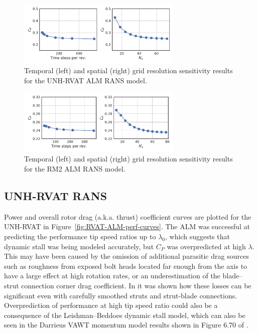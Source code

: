 \documentclass[times]{weauth}
\begin{document}
\begin{figure}
    \centering

    \includegraphics[width=0.7\textwidth]{RVAT-ALM_verification}

    \caption{Temporal (left) and spatial (right) grid resolution sensitivity
        results for the UNH-RVAT ALM RANS model.}

    \label{fig:RVAT-ALM-verification}
\end{figure}

\begin{figure}
    \centering

    \includegraphics[width=0.7\textwidth]{RM2-ALM_verification}

    \caption{Temporal (left) and spatial (right) grid resolution sensitivity
        results for the RM2 ALM RANS model.}

    \label{fig:RM2-ALM-verification}
\end{figure}


\subsection{UNH-RVAT RANS}

Power and overall rotor drag (a.k.a. thrust) coefficient curves are plotted for
the UNH-RVAT in Figure~\ref{fig:RVAT-ALM-perf-curves}. The ALM was successful at
predicting the performance tip speed ratios up to $\lambda_0$, which suggests
that dynamic stall was being modeled accurately, but $C_P$ was overpredicted at
high $\lambda$. This may have been caused by the omission of additional
parasitic drag sources such as roughness from exposed bolt heads located far
enough from the axis to have a large effect at high rotation rates, or an
underestimation of the blade--strut connection corner drag coefficient. In
\cite{Rawlings2008,Bachant2016-RM2-paper} it was shown how these losses can be
significant even with carefully smoothed struts and strut-blade connections.
Overprediction of performance at high tip speed ratio could also be a
consequence of the Leishman--Beddoes dynamic stall model, which can also be seen
in the Darrieus VAWT momentum model results shown in Figure 6.70 of
\cite{Para2002}.
\end{document}
